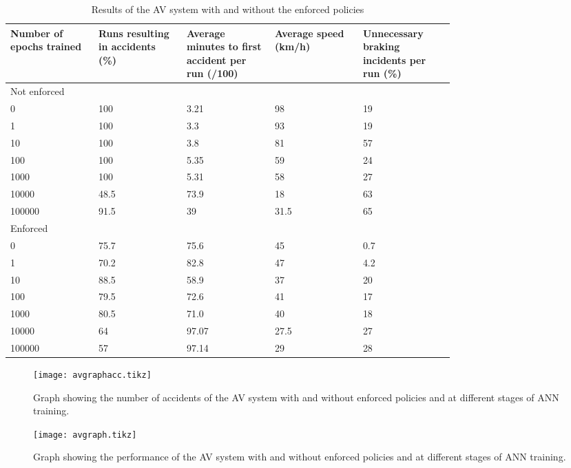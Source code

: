 \begin{table}[H]
	\centering
	\caption{Results of the AV system with and without the enforced policies}
	\label{table:avenf}
	\begin{tabular}{|p{0.15\linewidth}|p{0.15\linewidth}|p{0.15\linewidth}|p{0.15\linewidth}|p{0.15\linewidth}|}
		\hline Number of epochs trained & Runs resulting in accidents (\%) & Average minutes to first accident per run (/100) & Average speed (km/h) & Unnecessary braking incidents per run (\%) \\ \hline
		\multicolumn{5}{|p{0.75\linewidth}|}{Not enforced} \\ \hline
		0 & 100	 & 3.21 & 98 & 19 \\ \hline
		1 & 100 & 3.3 & 93 & 19 \\ \hline
		10 & 100 & 3.8 & 81 & 57 \\ \hline
		100 & 100 & 5.35 & 59 & 24 \\ \hline
		1000 & 100 & 5.31 & 58 & 27 \\  \hline
		10000 & 48.5 & 73.9 & 18 & 63 \\ \hline
		100000 & 91.5 & 39 & 31.5 & 65 \\ \hline 
		\multicolumn{5}{|p{0.75\linewidth}|}{Enforced} \\ \hline
		0 & 75.7 & 75.6 & 45 & 0.7 \\ \hline 
		1 & 70.2 & 82.8 & 47 & 4.2 \\ \hline 
		10 & 88.5 & 58.9 & 37 & 20 \\ \hline 
		100 & 79.5 & 72.6 & 41 & 17 \\ \hline 
		1000 & 80.5 & 71.0 & 40 & 18 \\ \hline 
		10000 & 64 & 97.07 & 27.5 & 27 \\ \hline   
		100000 & 57 & 97.14 & 29 & 28 \\ \hline                  
	\end{tabular}
\end{table}

\begin{figure}[H]
	\centering
	\texttt{[image: avgraphacc.tikz]}
	\caption{Graph showing the number of accidents of the AV system with and without enforced policies and at different stages of \ac{ANN} training. \label{fig:avaccidents}}
\end{figure}

\begin{figure}[H]
	\centering
	\texttt{[image: avgraph.tikz]}
	\caption{Graph showing the performance of the AV system with and without enforced policies and at different stages of \ac{ANN} training. \label{fig:avtrained}}
\end{figure}

